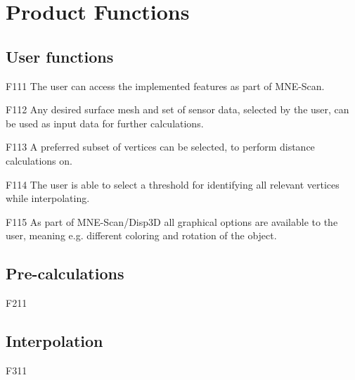 \section{Product Functions}

\subsection{User functions}

	\begin{aims}
	
		\item[F111]	The user can access the implemented features as part of MNE-Scan.
		\item[F112] Any desired surface mesh and set of sensor data, selected by the user, can be used as input data for 							further calculations.
		\item[F113] A preferred subset of vertices can be selected, to perform distance calculations on. 
		\item[F114] The user is able to select a threshold for identifying all relevant vertices while interpolating. 
		\item[F115] As part of MNE-Scan/Disp3D all graphical options are available to the user, meaning e.g. different 								coloring and rotation of the object.
	
	\end{aims}

\subsection{Pre-calculations}
	
	\begin{aims}
	
		\item[F211]		
	
	\end{aims}
	
\subsection{Interpolation}
	
	\begin{aims}
	
		\item[F311]		
	
	\end{aims}